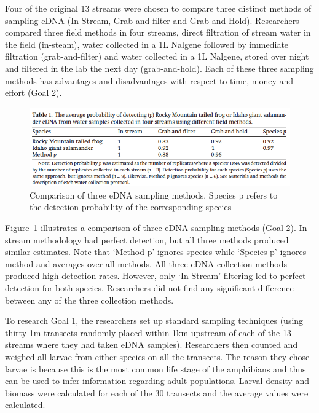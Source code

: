 \vspace{5mm}

Four of the original 13 streams were chosen to compare three distinct methods of sampling eDNA (In-Stream, Grab-and-filter and Grab-and-Hold). Researchers compared three field methods in four streams, direct filtration of stream water in the field (in-steam), water collected in a 1L Nalgene followed by immediate filtration (grab-and-filter) and water collected in a 1L Nalgene, stored over night and filtered in the lab the next day (grab-and-hold). Each of these three sampling methods has advantages and disadvantages with respect to time, money and effort (Goal 2).

\begin{figure}[H]
\includegraphics[scale=0.8]{Chapter2Images/rockymountain1.png}
\caption{Comparison of three eDNA sampling methods. Species p refers to the detection probability of the corresponding species \citep{occupancyamphibians}}
\label{fig:comparisonedna}
\end{figure}


Figure~\ref{fig:comparisonedna} illustrates a comparison of three eDNA sampling methods (Goal 2).  In stream methodology had perfect detection, but all three methods produced similar estimates. Note that `Method p' ignores species while `Species p' ignores method and averages over all methods. All three eDNA collection methods produced high detection rates. However, only `In-Stream' filtering led to perfect detection for both species. Researchers did not find any significant difference between any of the three collection methods. 
\vspace{5mm}


To research Goal 1, the researchers  set up standard sampling techniques (using thirty 1m transects randomly placed within 1km upstream of each of the 13 streams where they had taken eDNA samples).  Researchers then counted and weighed all larvae from either species on all the transects. The reason they chose larvae is because this is the most common life stage of the amphibians and thus can be used to infer information regarding adult populations. Larval density and biomass were calculated for each of the 30 transects and the average values were calculated.

